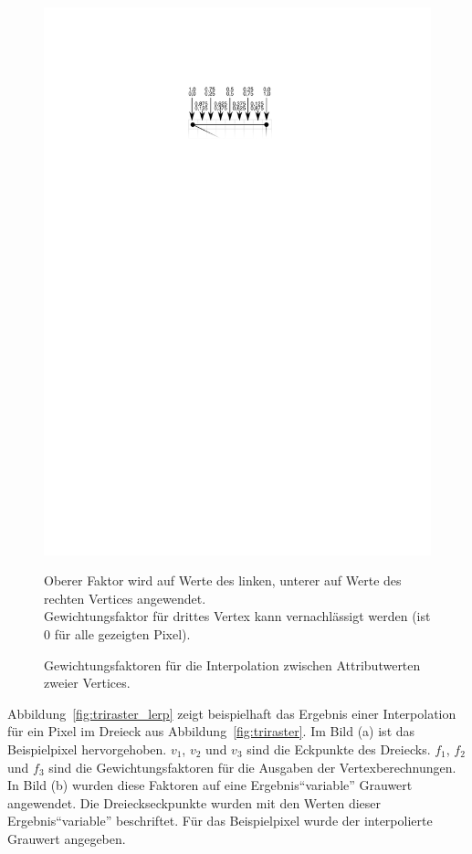 \documentclass[twoside,a4paper,fleqn,12pt]{book}
\begin{document}
\begin{figure}[h]
  \centering
  \includegraphics[scale=0.8]{interp_simple}
  \caption{Gewichtungsfaktoren für die Interpolation zwischen Attributwerten zweier Vertices.}
  \small Oberer Faktor wird auf Werte des linken, unterer auf Werte des rechten Vertices angewendet.\\
  Gewichtungsfaktor für drittes Vertex kann vernachlässigt werden (ist $0$ für alle gezeigten Pixel).
  \label{fig:interp_simple}
\end{figure}

Abbildung~\ref{fig:triraster_lerp} zeigt beispielhaft das Ergebnis einer Interpolation für ein Pixel im Dreieck aus Abbildung~\ref{fig:triraster}.
Im Bild (a) ist das Beispielpixel hervorgehoben. $v_1$, $v_2$ und $v_3$ sind die Eckpunkte des Dreiecks.
$f_1$, $f_2$ und $f_3$ sind die Gewichtungsfaktoren für die Ausgaben der Vertexberechnungen.
In Bild (b) wurden diese Faktoren auf eine Ergebnis"`variable"' Grauwert angewendet. Die Dreieckseckpunkte wurden mit den Werten
dieser Ergebnis"`variable"' beschriftet. Für das Beispielpixel wurde der interpolierte Grauwert angegeben.
\end{document}
